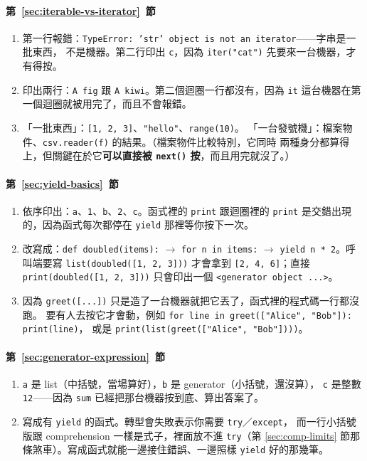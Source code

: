 \paragraph{第~\ref{sec:iterable-vs-iterator}~節}
\begin{enumerate}
\item 第一行報錯：\texttt{TypeError: 'str' object is not an iterator}——字串是一批東西，
不是機器。第二行印出 \texttt{c}，因為 \texttt{iter("cat")} 先要來一台機器，才有得按。
\item 印出兩行：\texttt{A fig} 跟 \texttt{A kiwi}。第二個迴圈一行都沒有，因為
\texttt{it} 這台機器在第一個迴圈就被用完了，而且不會報錯。
\item 「一批東西」：\texttt{[1, 2, 3]}、\texttt{"hello"}、\texttt{range(10)}。
「一台發號機」：檔案物件、\texttt{csv.reader(f)} 的結果。（檔案物件比較特別，它同時
兩種身分都算得上，但關鍵在於它\textbf{可以直接被 \texttt{next()} 按}，而且用完就沒了。）
\end{enumerate}

\paragraph{第~\ref{sec:yield-basics}~節}
\begin{enumerate}
\item 依序印出：\texttt{a}、\texttt{1}、\texttt{b}、\texttt{2}、\texttt{c}。函式裡的
\texttt{print} 跟迴圈裡的 \texttt{print} 是交錯出現的，因為函式每次都停在 \texttt{yield}
那裡等你按下一次。
\item 改寫成：\texttt{def doubled(items):} $\to$ \texttt{for n in items:} $\to$
\texttt{yield n * 2}。呼叫端要寫 \texttt{list(doubled([1, 2, 3]))} 才會拿到
\texttt{[2, 4, 6]}；直接 \texttt{print(doubled([1, 2, 3]))} 只會印出一個
\texttt{<generator object ...>}。
\item 因為 \texttt{greet([...])} 只是造了一台機器就把它丟了，函式裡的程式碼一行都沒跑。
要有人去按它才會動，例如 \texttt{for line in greet(["Alice", "Bob"]): print(line)}，
或是 \texttt{print(list(greet(["Alice", "Bob"])))}。
\end{enumerate}

\paragraph{第~\ref{sec:generator-expression}~節}
\begin{enumerate}
\item \texttt{a} 是 list（中括號，當場算好），\texttt{b} 是 generator（小括號，還沒算），
\texttt{c} 是整數 \texttt{12}——因為 \texttt{sum} 已經把那台機器按到底、算出答案了。
\item 寫成有 \texttt{yield} 的函式。轉型會失敗表示你需要 \texttt{try}／\texttt{except}，
而一行小括號版跟 comprehension 一樣是式子，裡面放不進 \texttt{try}（第
\ref{sec:comp-limits} 節那條煞車）。寫成函式就能一邊接住錯誤、一邊照樣 \texttt{yield}
好的那幾筆。
\end{enumerate}

